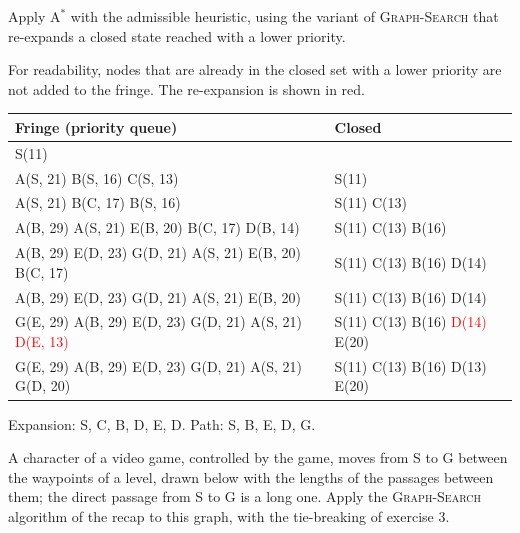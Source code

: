 \documentclass[11pt, a4paper]{exam}
\newcommand{\Astar}{$\text{A}^*$}
\begin{document}
\begin{exercises}[1, 3 (a)--(c), 5]
\begin{parts}
\begin{subparts}
        \subpart Apply \Astar{} with the admissible heuristic, using the variant of \textsc{Graph-Search} that re-expands a closed state reached with a lower priority.

        \begin{solution}
            For readability, nodes that are already in the closed set with a lower priority are not added to the fringe. The re-expansion is shown in red.

            \begin{center}
                \small
                \begin{tabular}{ll}
                    \toprule
                    Fringe (priority queue) & Closed \\
                    \midrule
                    S(11) & \\
                    A(S, 21) B(S, 16) C(S, 13) & S(11) \\
                    A(S, 21) B(C, 17) B(S, 16) & S(11) C(13) \\
                    A(B, 29) A(S, 21) E(B, 20) B(C, 17) D(B, 14) & S(11) C(13) B(16) \\
                    A(B, 29) E(D, 23) G(D, 21) A(S, 21) E(B, 20) B(C, 17) & S(11) C(13) B(16) D(14) \\
                    A(B, 29) E(D, 23) G(D, 21) A(S, 21) E(B, 20) & S(11) C(13) B(16) D(14) \\
                    G(E, 29) A(B, 29) E(D, 23) G(D, 21) A(S, 21) \textcolor{red}{D(E, 13)} & S(11) C(13) B(16) \textcolor{red}{D(14)} E(20) \\
                    G(E, 29) A(B, 29) E(D, 23) G(D, 21) A(S, 21) G(D, 20) & S(11) C(13) B(16) D(13) E(20) \\
                    \bottomrule
                \end{tabular}
            \end{center}

            Expansion: S, C, B, D, E, D. Path: S, B, E, D, G.
        \end{solution}
    \end{subparts}
\end{parts}


A character of a video game, controlled by the game, moves from S to G between the waypoints of a level, drawn below with the lengths of the passages between them; the direct passage from S to G is a long one. Apply the \textsc{Graph-Search} algorithm of the recap to this graph, with the tie-breaking of exercise 3.


\end{exercises}
\end{document}
